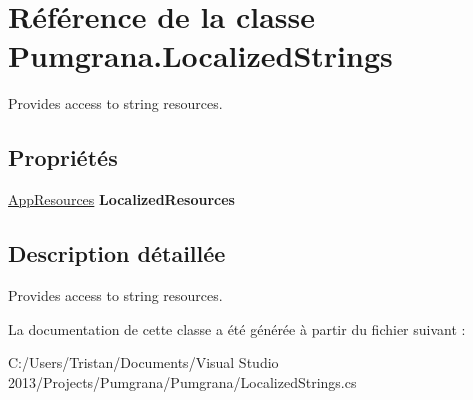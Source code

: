\hypertarget{class_pumgrana_1_1_localized_strings}{\section{Référence de la classe Pumgrana.\+Localized\+Strings}
\label{class_pumgrana_1_1_localized_strings}
}


Provides access to string resources.  


\subsection*{Propriétés}
\begin{DoxyCompactItemize}
\item 
\hypertarget{class_pumgrana_1_1_localized_strings_a0b74dacecb7afcd0d5c9a49ed15a5d9e}{\hyperlink{class_pumgrana_1_1_resources_1_1_app_resources}{App\+Resources} {\bfseries Localized\+Resources}}\label{class_pumgrana_1_1_localized_strings_a0b74dacecb7afcd0d5c9a49ed15a5d9e}

\end{DoxyCompactItemize}


\subsection{Description détaillée}
Provides access to string resources. 



La documentation de cette classe a été générée à partir du fichier suivant \+:\begin{DoxyCompactItemize}
\item 
C\+:/\+Users/\+Tristan/\+Documents/\+Visual Studio 2013/\+Projects/\+Pumgrana/\+Pumgrana/Localized\+Strings.\+cs\end{DoxyCompactItemize}
